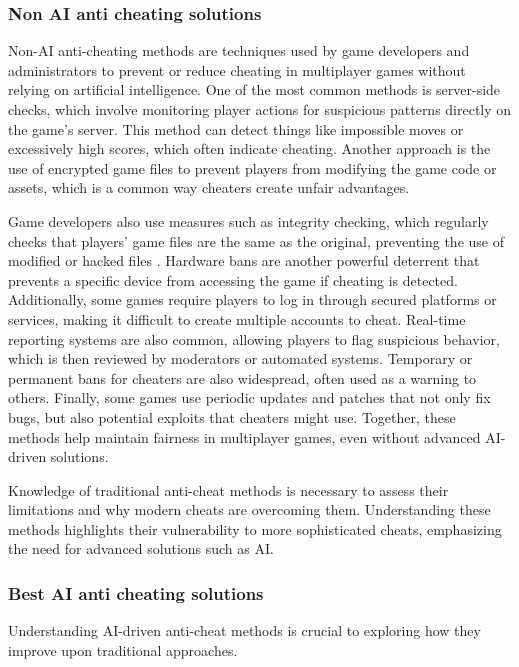 \subsubsection{Non AI anti cheating solutions}

Non-AI anti-cheating methods are techniques used by game developers and administrators to prevent or reduce cheating in multiplayer games without relying on artificial intelligence. One of the most common methods is server-side checks, which involve monitoring player actions for suspicious patterns directly on the game's server. This method can detect things like impossible moves or excessively high scores, which often indicate cheating. Another approach is the use of encrypted game files to prevent players from modifying the game code or assets, which is a common way cheaters create unfair advantages.

Game developers also use measures such as integrity checking, which regularly checks that players' game files are the same as the original, preventing the use of modified or hacked files \cite{s24144737}. Hardware bans are another powerful deterrent that prevents a specific device from accessing the game if cheating is detected. Additionally, some games require players to log in through secured platforms or services, making it difficult to create multiple accounts to cheat. Real-time reporting systems are also common, allowing players to flag suspicious behavior, which is then reviewed by moderators or automated systems. Temporary or permanent bans for cheaters are also widespread, often used as a warning to others. Finally, some games use periodic updates and patches that not only fix bugs, but also potential exploits that cheaters might use. Together, these methods help maintain fairness in multiplayer games, even without advanced AI-driven solutions.

Knowledge of traditional anti-cheat methods is necessary to assess their limitations and why modern cheats are overcoming them. Understanding these methods highlights their vulnerability to more sophisticated cheats, emphasizing the need for advanced solutions such as AI.

\subsubsection{Best AI anti cheating solutions}

Understanding AI-driven anti-cheat methods is crucial to exploring how they improve upon traditional approaches.


